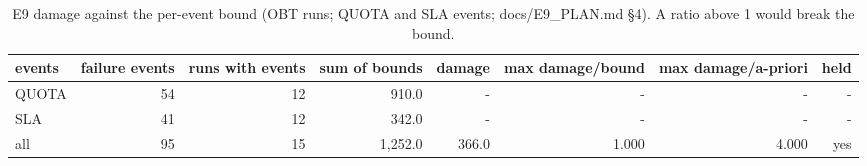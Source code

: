 \begin{table}[t]
\centering
\small
\caption{E9 damage against the per-event bound (OBT runs; QUOTA and SLA events; docs/E9\_PLAN.md §4). A ratio above 1 would break the bound.}
\label{tab:e9_damage_vs_bound}
\begin{tabular}{lrrrrrrr}
\toprule
events & failure events & runs with events & sum of bounds & damage & max damage/bound & max damage/a-priori & held \\
\midrule
QUOTA & 54 & 12 & 910.0 & - & - & - & - \\
SLA & 41 & 12 & 342.0 & - & - & - & - \\
all & 95 & 15 & 1,252.0 & 366.0 & 1.000 & 4.000 & yes \\
\bottomrule
\end{tabular}
\end{table}

